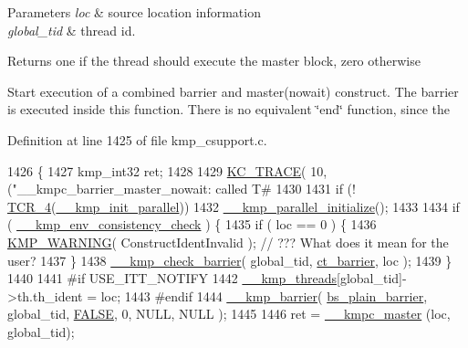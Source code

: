 \begin{DoxyParams}{Parameters}
{\em loc} & source location information \\
\hline
{\em global\-\_\-tid} & thread id. \\
\hline
\end{DoxyParams}
\begin{DoxyReturn}{Returns}
one if the thread should execute the master block, zero otherwise
\end{DoxyReturn}
Start execution of a combined barrier and master(nowait) construct. The barrier is executed inside this function. There is no equivalent \char`\"{}end\char`\"{} function, since the 

Definition at line 1425 of file kmp\-\_\-csupport.\-c.


\begin{DoxyCode}
1426 \{
1427     kmp\_int32 ret;
1428 
1429     \hyperlink{kmp__debug_8h_ab49eefbf8c74cfe98a90ce7ec8864add}{KC\_TRACE}( 10, (\textcolor{stringliteral}{"\_\_kmpc\_barrier\_master\_nowait: called T#%
1430 
1431     \textcolor{keywordflow}{if} (! \hyperlink{kmp__os_8h_acd6256e4afba32d90997235fc0a38a74}{TCR\_4}(\hyperlink{kmp_8h_aa23ece0d05f38387c8a8441aaad368df}{\_\_kmp\_init\_parallel}))
1432         \hyperlink{kmp_8h_a9c18846c648d84276b9dd5a1d650ab04}{\_\_kmp\_parallel\_initialize}();
1433 
1434     \textcolor{keywordflow}{if} ( \hyperlink{kmp_8h_ab4062d4f566c901230e51490a8819ba0}{\_\_kmp\_env\_consistency\_check} ) \{
1435         \textcolor{keywordflow}{if} ( loc == 0 ) \{
1436             \hyperlink{kmp__i18n_8h_a5aeb48e92a07c52661a33ec3fcee938f}{KMP\_WARNING}( ConstructIdentInvalid ); \textcolor{comment}{// ??? What does it mean for the user?}
1437         \}
1438         \hyperlink{kmp__error_8c_abb3f10ea6dadb00a31da4ee423370b51}{\_\_kmp\_check\_barrier}( global\_tid, \hyperlink{kmp_8h_a1582e7ddc609220a660d10244ef3e315ad94538ba658a409b239d438839b0652d}{ct\_barrier}, loc );
1439     \}
1440 
1441 \textcolor{preprocessor}{#if USE\_ITT\_NOTIFY}
1442 \textcolor{preprocessor}{}    \hyperlink{kmp_8h_a8ba907eb5a2568ff55a49a1504cd3624}{\_\_kmp\_threads}[global\_tid]->th.th\_ident = loc;
1443 \textcolor{preprocessor}{#endif}
1444 \textcolor{preprocessor}{}    \hyperlink{kmp_8h_a2db240b744f3af1eb8413df50dbe6118}{\_\_kmp\_barrier}( \hyperlink{kmp_8h_ad0f7c21f2f1d446087ef5714eb0fd8cfa364ac8fcf1df87a7d5793a693f2e4051}{bs\_plain\_barrier}, global\_tid, 
      \hyperlink{kmp_8h_aa93f0eb578d23995850d61f7d61c55c1}{FALSE}, 0, NULL, NULL );
1445 
1446     ret = \hyperlink{group__WORK__SHARING_ga721f06c8017479ccc6cb46ae0552b597}{\_\_kmpc\_master} (loc, global\_tid);
}
\end{DoxyCode}
